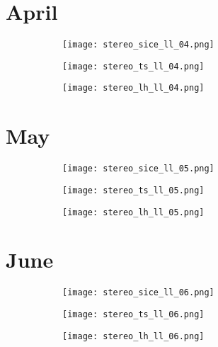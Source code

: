 \documentclass[preview]{standalone}
\begin{document}
\section*{April}
\begin{figure}
  \begin{subfigure}[t]{0.329\textwidth}
    \texttt{[image: stereo\_sice\_ll\_04.png]}
  \end{subfigure}
  \begin{subfigure}[t]{0.329\textwidth}
    \texttt{[image: stereo\_ts\_ll\_04.png]}
  \end{subfigure}
  \begin{subfigure}[t]{0.329\textwidth}
    \texttt{[image: stereo\_lh\_ll\_04.png]}
  \end{subfigure}
\end{figure}

\section*{May}
\begin{figure}
  \begin{subfigure}[t]{0.329\textwidth}
    \texttt{[image: stereo\_sice\_ll\_05.png]}
  \end{subfigure}
  \begin{subfigure}[t]{0.329\textwidth}
    \texttt{[image: stereo\_ts\_ll\_05.png]}
  \end{subfigure}
  \begin{subfigure}[t]{0.329\textwidth}
    \texttt{[image: stereo\_lh\_ll\_05.png]}
  \end{subfigure}
\end{figure}

\section*{June}
\begin{figure}
  \begin{subfigure}[t]{0.329\textwidth}
    \texttt{[image: stereo\_sice\_ll\_06.png]}
  \end{subfigure}
  \begin{subfigure}[t]{0.329\textwidth}
    \texttt{[image: stereo\_ts\_ll\_06.png]}
  \end{subfigure}
  \begin{subfigure}[t]{0.329\textwidth}
    \texttt{[image: stereo\_lh\_ll\_06.png]}
  \end{subfigure}
\end{figure}
\end{document}
